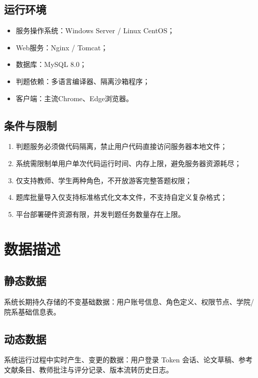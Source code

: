 \documentclass{../template/softeng}
\begin{document}
\subsection{运行环境}
\begin{itemize}
    \item 服务操作系统：Windows Server / Linux CentOS；
    \item Web服务：Nginx / Tomcat；
    \item 数据库：MySQL 8.0；
    \item 判题依赖：多语言编译器、隔离沙箱程序；
    \item 客户端：主流Chrome、Edge浏览器。
\end{itemize}

\subsection{条件与限制}
\begin{enumerate}
    \item 判题服务必须做代码隔离，禁止用户代码直接访问服务器本地文件；
    \item 系统需限制单用户单次代码运行时间、内存上限，避免服务器资源耗尽；
    \item 仅支持教师、学生两种角色，不开放游客完整答题权限；
    \item 题库批量导入仅支持标准格式化文本文件，不支持自定义复杂格式；
    \item 平台部署硬件资源有限，并发判题任务数量存在上限。
\end{enumerate}

\section{数据描述}
\subsection{静态数据}
系统长期持久存储的不变基础数据：用户账号信息、角色定义、权限节点、学院/院系基础信息表。
\subsection{动态数据}
系统运行过程中实时产生、变更的数据：用户登录 Token 会话、论文草稿、参考文献条目、教师批注与评分记录、版本流转历史日志。
\end{document}
